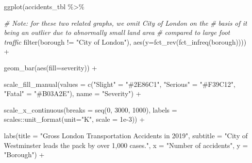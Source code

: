 \documentclass[
]{article}
\newenvironment{Shaded}{\begin{snugshade}}{\end{snugshade}}
\newcommand{\AttributeTok}[1]{\textcolor[rgb]{0.77,0.63,0.00}{#1}}
\newcommand{\CommentTok}[1]{\textcolor[rgb]{0.56,0.35,0.01}{\textit{#1}}}
\newcommand{\DecValTok}[1]{\textcolor[rgb]{0.00,0.00,0.81}{#1}}
\newcommand{\FloatTok}[1]{\textcolor[rgb]{0.00,0.00,0.81}{#1}}
\newcommand{\FunctionTok}[1]{\textcolor[rgb]{0.00,0.00,0.00}{#1}}
\newcommand{\NormalTok}[1]{#1}
\newcommand{\OtherTok}[1]{\textcolor[rgb]{0.56,0.35,0.01}{#1}}
\newcommand{\SpecialCharTok}[1]{\textcolor[rgb]{0.00,0.00,0.00}{#1}}
\newcommand{\StringTok}[1]{\textcolor[rgb]{0.31,0.60,0.02}{#1}}
\begin{document}
\begin{Shaded}
\begin{Highlighting}[]
\FunctionTok{ggplot}\NormalTok{(accidents\_tbl }\SpecialCharTok{\%\textgreater{}\%}
           
           \CommentTok{\# Note: for these two related graphs, we omit City of London on the }
           \CommentTok{\# basis of it being an outlier due to abnormally small land area }
           \CommentTok{\# compared to large foot traffic}
           \FunctionTok{filter}\NormalTok{(borough }\SpecialCharTok{!=} \StringTok{"City of London"}\NormalTok{), }
         \FunctionTok{aes}\NormalTok{(}\AttributeTok{y=}\FunctionTok{fct\_rev}\NormalTok{(}\FunctionTok{fct\_infreq}\NormalTok{(borough)))) }\SpecialCharTok{+}
    
    \FunctionTok{geom\_bar}\NormalTok{(}\FunctionTok{aes}\NormalTok{(}\AttributeTok{fill=}\NormalTok{severity)) }\SpecialCharTok{+}
    
    \FunctionTok{scale\_fill\_manual}\NormalTok{(}\AttributeTok{values =} \FunctionTok{c}\NormalTok{(}\StringTok{"Slight"} \OtherTok{=} \StringTok{"\#2E86C1"}\NormalTok{, }
                                 \StringTok{"Serious"} \OtherTok{=} \StringTok{"\#F39C12"}\NormalTok{, }
                                 \StringTok{"Fatal"} \OtherTok{=} \StringTok{"\#B03A2E"}\NormalTok{),}
                      \AttributeTok{name =} \StringTok{"Severity"}\NormalTok{) }\SpecialCharTok{+}
    
    \FunctionTok{scale\_x\_continuous}\NormalTok{(}\AttributeTok{breaks =} \FunctionTok{seq}\NormalTok{(}\DecValTok{0}\NormalTok{, }\DecValTok{3000}\NormalTok{, }\DecValTok{1000}\NormalTok{),}
                       \AttributeTok{labels =}\NormalTok{ scales}\SpecialCharTok{::}\FunctionTok{unit\_format}\NormalTok{(}\AttributeTok{unit=}\StringTok{"K"}\NormalTok{, }\AttributeTok{scale =} \FloatTok{1e{-}3}\NormalTok{)) }\SpecialCharTok{+}
    
    \FunctionTok{labs}\NormalTok{(}\AttributeTok{title =} \StringTok{"Gross London Transportation Accidents in 2019"}\NormalTok{,}
         \AttributeTok{subtitle =} \StringTok{"City of Westminster leads the pack by over 1,000 cases."}\NormalTok{,}
         \AttributeTok{x =} \StringTok{"Number of accidents"}\NormalTok{,}
         \AttributeTok{y =} \StringTok{"Borough"}\NormalTok{) }\SpecialCharTok{+}
    

\end{Highlighting}
\end{Shaded}
\end{document}
